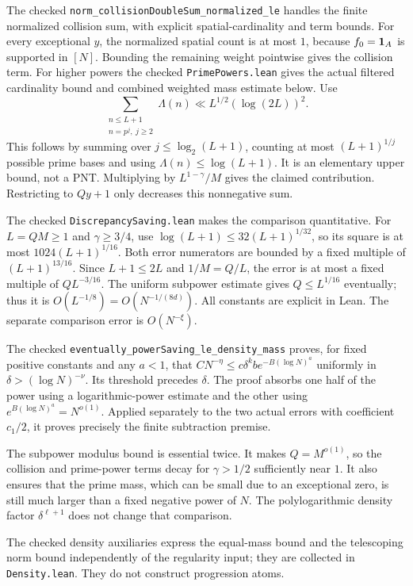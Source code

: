 The checked \texttt{norm\_\allowbreak{}collisionDoubleSum\_\allowbreak{}normalized\_\allowbreak{}le} handles the finite normalized collision sum, with explicit spatial-cardinality and term bounds. For every exceptional $y$, the normalized spatial count is at most $1$, because $f_0=\mathbf 1_A$ is supported in $[N]$. Bounding the remaining weight pointwise gives the collision term. For higher powers the checked \texttt{PrimePowers.lean} gives the actual filtered cardinality bound and combined weighted mass estimate below. Use
\[
 \sum_{\substack{n\leq L+1\\n=p^j,\ j\geq2}}\Lambda(n)
 \ll L^{1/2}(\log(2L))^2.
\]
This follows by summing over $j\leq\log_2(L+1)$, counting at most $(L+1)^{1/j}$ possible prime bases and using $\Lambda(n)\leq\log(L+1)$. It is an elementary upper bound, not a PNT. Multiplying by $L^{1-\gamma}/M$ gives the claimed contribution. Restricting to $Qy+1$ only decreases this nonnegative sum.

The checked \texttt{DiscrepancySaving.lean} makes the comparison quantitative. For $L=QM\geq1$ and $\gamma\geq3/4$, use $\log(L+1)\leq32(L+1)^{1/32}$, so its square is at most $1024(L+1)^{1/16}$. Both error numerators are bounded by a fixed multiple of $(L+1)^{13/16}$. Since $L+1\leq2L$ and $1/M=Q/L$, the error is at most a fixed multiple of $QL^{-3/16}$. The uniform subpower estimate gives $Q\leq L^{1/16}$ eventually; thus it is $O(L^{-1/8})=O(N^{-1/(8d)})$. All constants are explicit in Lean. The separate comparison error is $O(N^{-\xi})$.

The checked \texttt{eventually\_\allowbreak{}powerSaving\_\allowbreak{}le\_\allowbreak{}density\_\allowbreak{}mass} proves, for fixed positive constants and any $a<1$, that $CN^{-\eta}\leq c\delta^k b e^{-B(\log N)^a}$ uniformly in $\delta>(\log N)^{-\nu}$. Its threshold precedes $\delta$. The proof absorbs one half of the power using a logarithmic-power estimate and the other using $e^{B(\log N)^a}=N^{o(1)}$. Applied separately to the two actual errors with coefficient $c_1/2$, it proves precisely the finite subtraction premise.

The subpower modulus bound is essential twice. It makes $Q=M^{o(1)}$, so the collision and prime-power terms decay for $\gamma>1/2$ sufficiently near $1$. It also ensures that the prime mass, which can be small due to an exceptional zero, is still much larger than a fixed negative power of $N$. The polylogarithmic density factor $\delta^{\ell+1}$ does not change that comparison.

The checked density auxiliaries express the equal-mass bound and the telescoping norm bound independently of the regularity input; they are collected in \texttt{Density.lean}. They do not construct progression atoms.

